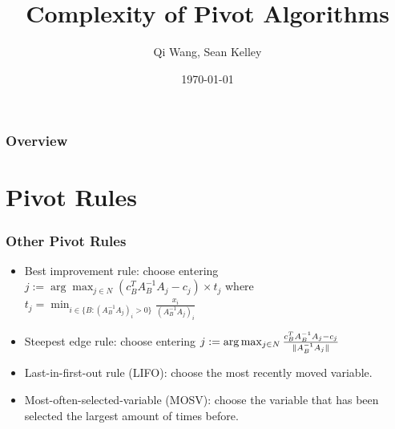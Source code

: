 \documentclass{beamer}
\title[Short title]{Complexity of Pivot Algorithms} %
\author{Qi Wang, Sean Kelley} %
\date{\today} %
\DeclarePairedDelimiter{\norm}{\lVert}{\rVert}
\begin{document}
\begin{frame}
\titlepage %
\end{frame}

\begin{frame}
\frametitle{Overview} %
\tableofcontents %
\end{frame}


\section{Pivot Rules} %
\begin{frame}
\frametitle{Other Pivot Rules}
\begin{itemize}
\item Best improvement rule: choose entering $j := \arg \max_{j\in N}(c_B^T A_B^{-1} A_j - c_j)\times t_j$ where $t_j = \min_{i \in \{B:(A_B^{-1}A_j)_{i} >0\}} \frac{x_i}{(A_B^{-1}A_j)_{i}}$
\item Steepest edge rule: choose entering $j: = \arg\max_{j \in N} \frac{c_B^TA_B^{-1}A_j - c_j}{\norm{A_B^{-1}A_j}}$
\item Last-in-first-out rule (LIFO): choose the most recently moved variable.
\item Most-often-selected-variable (MOSV): choose the variable that has been selected the largest amount of times before.
\end{itemize}
\end{frame}
\end{document}
